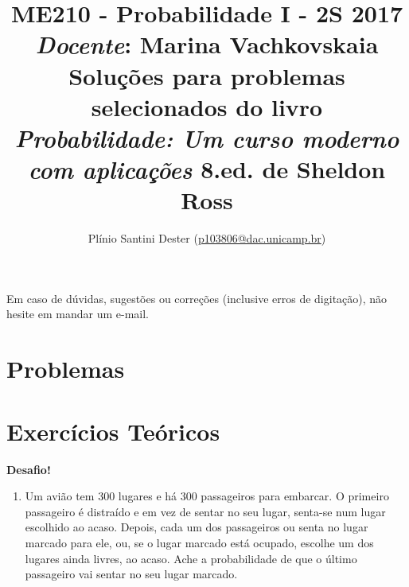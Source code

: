 


\title{	ME210 - Probabilidade I - 2S 2017\\
		{\large \textit{Docente}: Marina Vachkovskaia}\\[2mm]
		{\large Soluções para problemas selecionados do livro\\[-2mm]
        \textit{Probabilidade: Um curso moderno com aplicações}
        8.ed. de Sheldon Ross}\\
}
\author{Plínio Santini Dester (\url{p103806@dac.unicamp.br})}



\maketitle

Em caso de dúvidas, sugestões ou correções (inclusive erros de digitação), não hesite em mandar um e-mail.

\setcounter{section}{2}
\section{Problemas}

\newpage

\setcounter{section}{2}
\section{Exercícios Teóricos}


\vspace{3mm} {\LARGE \textbf{Desafio!}}
\begin{enumerate}
\item Um avião tem 300 lugares e há 300 passageiros para embarcar. O primeiro passageiro é distraído e em vez de sentar no seu lugar, senta-se num lugar escolhido ao acaso. Depois, cada um dos passageiros ou senta no lugar marcado para ele, ou, se o lugar marcado está ocupado, escolhe um dos lugares ainda livres, ao acaso. Ache a probabilidade de que o último passageiro vai sentar no seu lugar marcado.
\end{enumerate}


